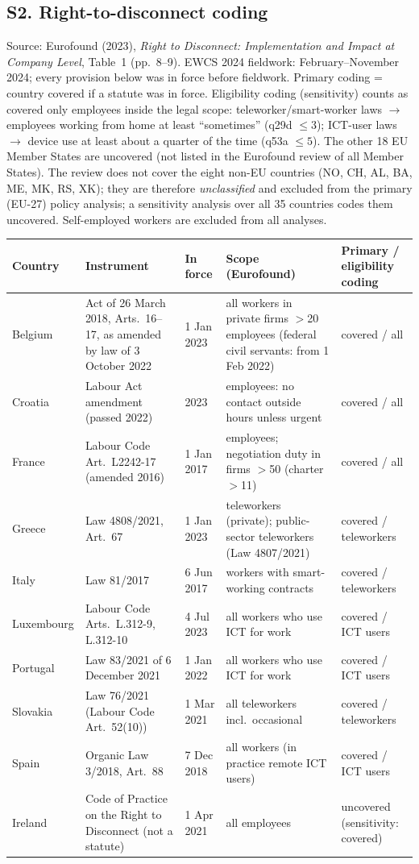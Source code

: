 \subsection*{S2. Right-to-disconnect coding}
Source: Eurofound (2023), \emph{Right to Disconnect: Implementation and Impact at Company Level}, Table~1 (pp.~8--9). EWCS 2024 fieldwork: February--November 2024; every provision below was in force before fieldwork. Primary coding = country covered if a statute was in force. Eligibility coding (sensitivity) counts as covered only employees inside the legal scope: teleworker/smart-worker laws $\rightarrow$ employees working from home at least ``sometimes'' (q29d $\le 3$); ICT-user laws $\rightarrow$ device use at least about a quarter of the time (q53a $\le 5$). The other 18 EU Member States are uncovered (not listed in the Eurofound review of all Member States). The review does not cover the eight non-EU countries (NO, CH, AL, BA, ME, MK, RS, XK); they are therefore \emph{unclassified} and excluded from the primary (EU-27) policy analysis; a sensitivity analysis over all 35 countries codes them uncovered. Self-employed workers are excluded from all analyses.
\begin{center}\footnotesize\setlength{\tabcolsep}{3pt}
\begin{longtable}{@{}p{1.6cm}p{5.6cm}p{1.9cm}p{4.3cm}p{2.2cm}@{}}
\toprule Country & Instrument & In force & Scope (Eurofound) & Primary / eligibility coding\\ \midrule\endhead
Belgium & Act of 26 March 2018, Arts.~16--17, as amended by law of 3 October 2022 & 1 Jan 2023 & all workers in private firms $>$20 employees (federal civil servants: from 1 Feb 2022) & covered / all\\
Croatia & Labour Act amendment (passed 2022) & 2023 & employees: no contact outside hours unless urgent & covered / all\\
France & Labour Code Art.~L2242-17 (amended 2016) & 1 Jan 2017 & employees; negotiation duty in firms $>$50 (charter $>$11) & covered / all\\
Greece & Law 4808/2021, Art.~67 & 1 Jan 2023 & teleworkers (private); public-sector teleworkers (Law 4807/2021) & covered / teleworkers\\
Italy & Law 81/2017 & 6 Jun 2017 & workers with smart-working contracts & covered / teleworkers\\
Luxembourg & Labour Code Arts.~L.312-9, L.312-10 & 4 Jul 2023 & all workers who use ICT for work & covered / ICT users\\
Portugal & Law 83/2021 of 6 December 2021 & 1 Jan 2022 & all workers who use ICT for work & covered / ICT users\\
Slovakia & Law 76/2021 (Labour Code Art.~52(10)) & 1 Mar 2021 & all teleworkers incl.\ occasional & covered / teleworkers\\
Spain & Organic Law 3/2018, Art.~88 & 7 Dec 2018 & all workers (in practice remote ICT users) & covered / ICT users\\
Ireland & Code of Practice on the Right to Disconnect (not a statute) & 1 Apr 2021 & all employees & uncovered (sensitivity: covered)\\
\bottomrule\end{longtable}\end{center}
